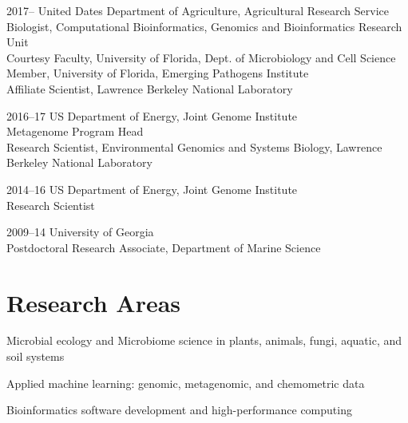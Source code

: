 \documentclass[12pt,letterpaper]{report}
\newcommand{\listitemspace}{0.15em}
\renewenvironment{itemize}
{\begin{list}{}{\setlength{\leftmargin}{0em}
            \setlength{\parskip}{0em}
            \setlength{\itemsep}{\listitemspace}
            \setlength{\parsep}{\listitemspace}}}
    {\end{list}}
\begin{document}
    \begin{tablist}

        \item[2017--]   \tab United Dates Department of Agriculture, Agricultural Research Service \\
                             Biologist, Computational Bioinformatics, Genomics and Bioinformatics Research Unit\\
                             \tab Courtesy Faculty, University of Florida, Dept. of Microbiology and Cell Science\\
                              \tab  Member, University of Florida, Emerging Pathogens Institute\\
                             \tab Affiliate Scientist, Lawrence Berkeley National Laboratory
                            

        \item[2016--17] \tab US Department of Energy, Joint Genome Institute \\
                             Metagenome Program Head \\
                             Research Scientist, Environmental Genomics and Systems Biology, Lawrence Berkeley National Laboratory \\
                             
        \item[2014--16] \tab US Department of Energy, Joint Genome Institute \\
                             Research Scientist  \\

        \item[2009--14] \tab University of Georgia \\
                             Postdoctoral Research Associate, Department of Marine Science
                             
		  

    \end{tablist}

    \section*{Research Areas}

    \begin{itemize}

        \item Microbial ecology and Microbiome science in plants, animals, fungi, aquatic, and soil systems

        \item Applied machine learning: genomic, metagenomic, and chemometric data 

        \item Bioinformatics software development and high-performance computing

    \end{itemize}
\end{document}
